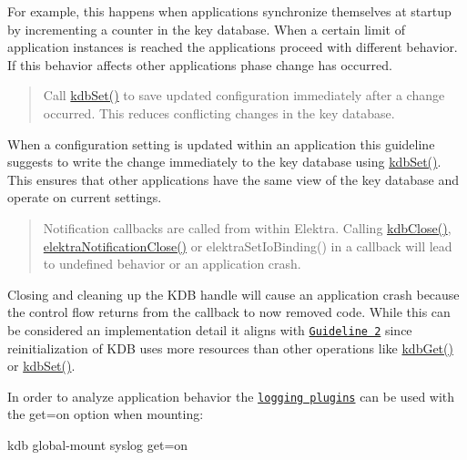 For example, this happens when applications synchronize themselves at startup by incrementing a counter in the key database. When a certain limit of application instances is reached the applications proceed with different behavior. If this behavior affects other applications phase change has occurred.

\begin{quote}
Call {\ttfamily \hyperlink{group__kdb_ga11436b058408f83d303ca5e996832bcf}{kdb\+Set()}} to save updated configuration immediately after a change occurred. This reduces conflicting changes in the key database. \end{quote}


When a configuration setting is updated within an application this guideline suggests to write the change immediately to the key database using {\ttfamily \hyperlink{group__kdb_ga11436b058408f83d303ca5e996832bcf}{kdb\+Set()}}. This ensures that other applications have the same view of the key database and operate on current settings.

\begin{quote}
Notification callbacks are called from within Elektra. Calling {\ttfamily \hyperlink{group__kdb_gadb54dc9fda17ee07deb9444df745c96f}{kdb\+Close()}}, {\ttfamily \hyperlink{group__kdbnotification_ga5685dafbd4131011365628d6d9213594}{elektra\+Notification\+Close()}} or {\ttfamily elektra\+Set\+Io\+Binding()} in a callback will lead to undefined behavior or an application crash. \end{quote}


Closing and cleaning up the K\+DB handle will cause an application crash because the control flow returns from the callback to now removed code. While this can be considered an implementation detail it aligns with \href{#guidline-2-wait-before-reacting-to-changes}{\tt Guideline 2} since reinitialization of K\+DB uses more resources than other operations like {\ttfamily \hyperlink{group__kdb_ga28e385fd9cb7ccfe0b2f1ed2f62453a1}{kdb\+Get()}} or {\ttfamily \hyperlink{group__kdb_ga11436b058408f83d303ca5e996832bcf}{kdb\+Set()}}.

In order to analyze application behavior the \href{https://www.libelektra.org/plugins/readme#notification-and-logging}{\tt logging plugins} can be used with the {\ttfamily get=on} option when mounting\+:


\begin{DoxyCode}
kdb global-mount syslog get=on
\end{DoxyCode}


